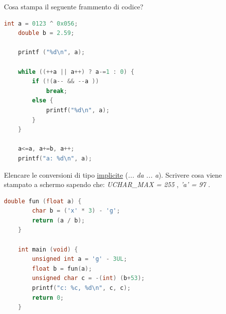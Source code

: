 
\begin{center}
\end{center}

\vspace{5mm}

\noindent{}

\begin{questions}


\question[5]
Cosa stampa il seguente frammento di codice?

\begin{minipage}[t]{0.4\linewidth}
	\begin{lstlisting}[language=C]
	int a = 0123 ^ 0x056;
	double b = 2.59;

	printf ("%d\n", a);
	
	while ((++a || a++) ? a-=1 : 0) {
		if (!(a-- && --a ))
			break;
		else {
			printf("%d\n", a); 
		}
	}
	
	a<=a, a+=b, a++;
	printf("a: %d\n", a); 
	\end{lstlisting}
\end{minipage}
\begin{minipage}[t]{0.6\linewidth}
	\makeemptybox{120pt}
\end{minipage}



\question[6]
Elencare le conversioni di tipo \underline{implicite} (\emph{... da ... a}). Scrivere cosa viene stampato a schermo sapendo che: \emph{UCHAR\_MAX = 255} , \emph{'a' = 97} .

\begin{minipage}[t]{0.4\linewidth}
	\begin{lstlisting}[language=C]
	double fun (float a) {
		char b = ('x' * 3) - 'g';
		return (a / b);
	}
	
	int main (void) {
		unsigned int a = 'g' - 3UL;
		float b = fun(a);
		unsigned char c = -(int) (b+53);
		printf("c: %c, %d\n", c, c);
		return 0;
	}
	\end{lstlisting}
\end{minipage}
\begin{minipage}[t]{0.6\linewidth}
	\makeemptybox{200pt}
\end{minipage}


\end{questions}
